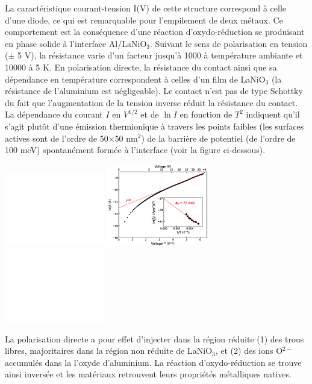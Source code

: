 La caractéristique courant-tension I(V) de cette structure correspond à celle d'une diode, ce qui est remarquable pour l'empilement de deux métaux.
Ce comportement est la conséquence d'une réaction d'oxydo-réduction se produisant en phase solide à l'interface Al/LaNiO$_3$.
Suivant le sens de polarisation en tension ($\pm$ 5 V), la résistance varie d'un facteur jusqu'à 1000 à température ambiante et 10000 à 5 K.
En polarisation directe, la résistance du contact ainsi que sa dépendance en température correspondent à celles d'un film de LaNiO$_3$ (la résistance de l'aluminium est négligeable). 
Le contact n'est pas de type Schottky du fait que l'augmentation de la tension inverse réduit la résistance du contact.
La dépendance du courant $I$ en $V^{1/2}$ et de $\ln I$ en fonction de $T^{2}$ indiquent qu'il s'agit plutôt d'une émission thermionique à travers les points faibles (les surfaces actives sont de l'ordre de 50$\times$50 nm$^{2}$) de la barrière de potentiel (de l'ordre de 100 meV) spontanément formée à l'interface (voir la figure ci-dessous).
\par 
\includegraphics[width=0.33\textwidth]{./figures/cadre_blanc.eps}
\includegraphics[width=0.33\textwidth]{./figures/G434_TE_IV.eps}
\includegraphics[width=0.33\textwidth]{./figures/cadre_blanc.eps}

La polarisation directe a pour effet d'injecter dans la région réduite (1) des trous libres, majoritaires dans la région non réduite de LaNiO$_3$, et (2) des ions O$^{2-}$ accumulés dans la l'oxyde d'aluminium.
La réaction d'oxydo-réduction se trouve ainsi inversée et les matériaux retrouvent leurs propriétés métalliques natives.


